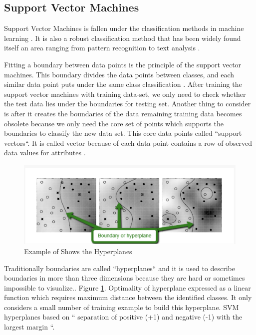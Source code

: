 \documentclass[sigconf]{acmart}
\begin{document}
\subsection{Support Vector Machines}
Support Vector Machines is fallen under the classification methods in machine learning \cite{www-simafore-svm}. It is also a robust classification method that has been widely found itself an area ranging from pattern recognition to text analysis \cite{www-simafore-svm}. 
\par Fitting a boundary between data points is the principle of the support vector machines. This boundary divides the data points between classes, and each similar data point puts under the same class classification \cite{www-simafore-svm}. After training the support vector machines with training data-set, we only need to check whether the test data lies under the boundaries for testing set. Another thing to consider is after it creates the boundaries of the data remaining training data becomes obsolete because we only need the core set of points which supports the boundaries to classify the new data set. This core data points called ``support vectors``. It is called vector because of each data point contains a row of observed data values for attributes \cite{www-simafore-svm}. 

 \begin{figure}[!ht]
  \centering
      \includegraphics[width=\columnwidth]{images/hyperplane-boundary.png}
  \caption{Example of Shows the Hyperplanes \cite{www-simafore-svm}}\label{fig:Hyperplane}
\end{figure}

\par Traditionally boundaries are called ``hyperplanes`` and it is used to describe boundaries in more than three dimensions because they are hard or sometimes impossible to visualize.\cite{www-simafore}. Figure \ref{fig:Hyperplane}. Optimality of hyperplane expressed as a linear function which requires maximum distance between the identified classes. It only considers a small number of training example to build this hyperplane. SVM hyperplanes based on `` separation of positive (+1) and negative (-1) with the largest margin \cite{verma-ssv}``.
\end{document}
